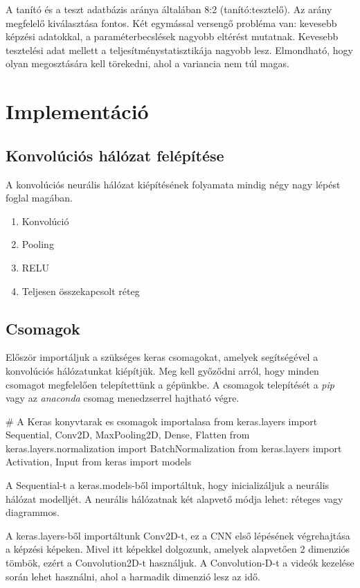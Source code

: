 A tanító és a teszt adatbázis aránya általában 8:2 (tanító:tesztelő). Az arány megfelelő kiválasztása fontos. Két egymással versengő probléma van: kevesebb képzési adatokkal, a paraméterbecslések nagyobb eltérést mutatnak. Kevesebb tesztelési adat mellett a teljesítménystatisztikája nagyobb lesz. Elmondható, hogy olyan megosztására kell törekedni, ahol a variancia nem túl magas.

\section{Implementáció}

\subsection{Konvolúciós hálózat felépítése}

A konvolúciós neurális hálózat kiépítésének folyamata mindig négy nagy lépést foglal magában.

\begin{enumerate}
\item Konvolúció
\item Pooling
\item RELU
\item Teljesen összekapcsolt réteg
\end{enumerate}

\subsection{Csomagok}

Először importáljuk a szükséges keras csomagokat, amelyek segítségével a konvolúciós hálózatunkat kiépítjük. Meg kell győződni arról, hogy minden csomagot megfelelően telepítettünk a gépünkbe. A csomagok telepítését a \textit{pip} vagy az \textit{anaconda} csomag menedzserrel hajtható végre.

\begin{python}
# A Keras konyvtarak es csomagok importalasa
from keras.layers import Sequential, Conv2D, MaxPooling2D, Dense, Flatten
from keras.layers.normalization import BatchNormalization
from keras.layers import Activation, Input
from keras import models
\end{python}

A Sequential-t a keras.models-ből importáltuk, hogy inicializáljuk a neurális hálózat modelljét. A neurális hálózatnak két alapvető módja lehet: réteges vagy diagrammos.

A keras.layers-ből importáltunk Conv2D-t, ez a CNN első lépésének végrehajtása a képzési képeken. Mivel itt képekkel dolgozunk, amelyek alapvetően 2 dimenziós tömbök, ezért a Convolution2D-t használjuk. A Convolution-D-t a videók kezelése során lehet használni, ahol a harmadik dimenzió lesz az idő.

